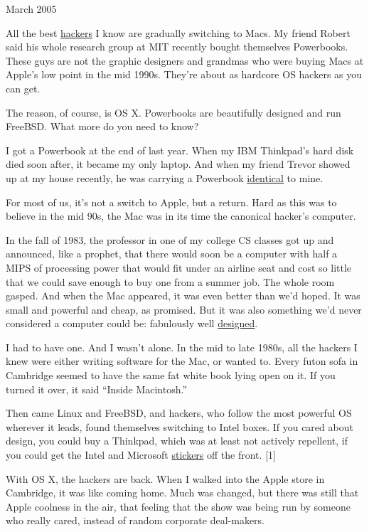 March 2005

All the best \href{gba.html}{hackers} I know are gradually switching to
Macs. My friend Robert said his whole research group at MIT recently
bought themselves Powerbooks. These guys are not the graphic designers
and grandmas who were buying Macs at Apple's low point in the mid 1990s.
They're about as hardcore OS hackers as you can get.

The reason, of course, is OS X. Powerbooks are beautifully designed and
run FreeBSD. What more do you need to know?

I got a Powerbook at the end of last year. When my IBM Thinkpad's hard
disk died soon after, it became my only laptop. And when my friend
Trevor showed up at my house recently, he was carrying a Powerbook
\href{tlbmac.html}{identical} to mine.

For most of us, it's not a switch to Apple, but a return. Hard as this
was to believe in the mid 90s, the Mac was in its time the canonical
hacker's computer.

In the fall of 1983, the professor in one of my college CS classes got
up and announced, like a prophet, that there would soon be a computer
with half a MIPS of processing power that would fit under an airline
seat and cost so little that we could save enough to buy one from a
summer job. The whole room gasped. And when the Mac appeared, it was
even better than we'd hoped. It was small and powerful and cheap, as
promised. But it was also something we'd never considered a computer
could be: fabulously well \href{taste.html}{designed}.

I had to have one. And I wasn't alone. In the mid to late 1980s, all the
hackers I knew were either writing software for the Mac, or wanted to.
Every futon sofa in Cambridge seemed to have the same fat white book
lying open on it. If you turned it over, it said ``Inside Macintosh.''

Then came Linux and FreeBSD, and hackers, who follow the most powerful
OS wherever it leads, found themselves switching to Intel boxes. If you
cared about design, you could buy a Thinkpad, which was at least not
actively repellent, if you could get the Intel and Microsoft
\href{designedforwindows.html}{stickers} off the front. {[}1{]}

With OS X, the hackers are back. When I walked into the Apple store in
Cambridge, it was like coming home. Much was changed, but there was
still that Apple coolness in the air, that feeling that the show was
being run by someone who really cared, instead of random corporate
deal-makers.

